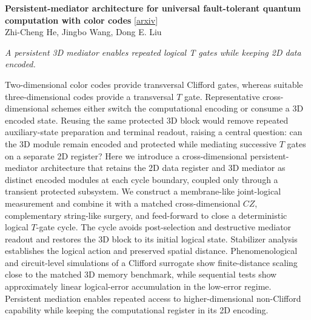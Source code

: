 \documentclass[12pt,letterpaper]{article}
\begin{document}
\medskip
{\small\textbf{Persistent-mediator architecture for universal fault-tolerant quantum computation with color codes}} {\scriptsize[\href{https://arxiv.org/abs/2611.16691}{arxiv}]}\nopagebreak\\
{\scriptsize Zhi-Cheng He, Jingbo Wang, Dong E. Liu}\nopagebreak\\[2pt]
{\footnotesize\textit{A persistent 3D mediator enables repeated logical T gates while keeping 2D data encoded.}\par}\nopagebreak
{\footnotesize Two-dimensional color codes provide transversal Clifford gates, whereas suitable three-dimensional codes provide a transversal $T$ gate. Representative cross-dimensional schemes either switch the computational encoding or consume a 3D encoded state. Reusing the same protected 3D block would remove repeated auxiliary-state preparation and terminal readout, raising a central question: can the 3D module remain encoded and protected while mediating successive $T$ gates on a separate 2D register? Here we introduce a cross-dimensional persistent-mediator architecture that retains the 2D data register and 3D mediator as distinct encoded modules at each cycle boundary, coupled only through a transient protected subsystem. We construct a membrane-like joint-logical measurement and combine it with a matched cross-dimensional $CZ$, complementary string-like surgery, and feed-forward to close a deterministic logical $T$-gate cycle. The cycle avoids post-selection and destructive mediator readout and restores the 3D block to its initial logical state. Stabilizer analysis establishes the logical action and preserved spatial distance. Phenomenological and circuit-level simulations of a Clifford surrogate show finite-distance scaling close to the matched 3D memory benchmark, while sequential tests show approximately linear logical-error accumulation in the low-error regime. Persistent mediation enables repeated access to higher-dimensional non-Clifford capability while keeping the computational register in its 2D encoding.\par}
\medskip
\end{document}
